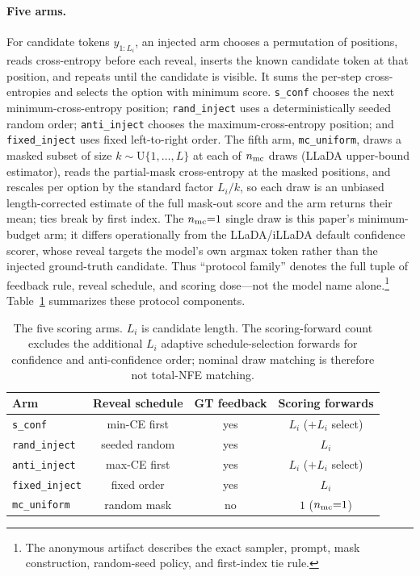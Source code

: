 \documentclass{article}
\newcommand{\sconf}{\texttt{s\_conf}}
\newcommand{\rinj}{\texttt{rand\_inject}}
\newcommand{\ainj}{\texttt{anti\_inject}}
\newcommand{\finj}{\texttt{fixed\_inject}}
\newcommand{\mcu}{\texttt{mc\_uniform}}
\begin{document}
\paragraph{Five arms.}
For candidate tokens $y_{1:L_i}$, an injected arm chooses a permutation of
positions, reads cross-entropy before each reveal, inserts the known candidate
token at that position, and repeats until the candidate is visible.  It sums
the per-step cross-entropies and selects the option with minimum score.
\sconf{} chooses the next minimum-cross-entropy position; \rinj{} uses a
deterministically seeded random order; \ainj{} chooses the maximum-cross-entropy
position; and \finj{} uses fixed left-to-right order.  The fifth arm, \mcu{},
draws a masked subset of size $k \sim \mathrm{U}\{1,\dots,L\}$ at each of
$n_{\rm mc}$ draws (LLaDA upper-bound estimator), reads the partial-mask
cross-entropy at the masked positions, and rescales per option by the standard
factor $L_i/k$, so each draw is an unbiased length-corrected estimate of the
full mask-out score and the arm returns their mean; ties break by first
index.  The $n_{\rm mc}{=}1$ single draw is this paper's minimum-budget arm;
it differs operationally from the LLaDA/iLLaDA default confidence scorer,
whose reveal targets the model's own argmax token rather than the injected
ground-truth candidate.  Thus ``protocol family''
denotes the full tuple of feedback rule, reveal schedule, and scoring dose---not
the model name alone.\footnote{The anonymous artifact describes the exact
sampler, prompt, mask construction, random-seed policy, and first-index tie
rule.}  Table~\ref{tab:arms} summarizes these protocol components.

\begin{table}[t]
\centering
\setlength{\tabcolsep}{3.4pt}
\caption{The five scoring arms.  $L_i$ is candidate length.  The scoring-forward
count excludes the additional $L_i$ adaptive schedule-selection forwards for
confidence and anti-confidence order; nominal draw matching is therefore not
total-NFE matching.}
\label{tab:arms}
\begin{tabular}{@{}lccc@{}}
\toprule
Arm & Reveal schedule & GT feedback & Scoring forwards \\
\midrule
\sconf{} & min-CE first & yes & $L_i$ ($+L_i$ select) \\
\rinj{} & seeded random & yes & $L_i$ \\
\ainj{} & max-CE first & yes & $L_i$ ($+L_i$ select) \\
\finj{} & fixed order & yes & $L_i$ \\
\mcu{} & random mask & no & \multicolumn{1}{c}{$1$ ($n_{\rm mc}{=}1$)} \\
\bottomrule
\end{tabular}
\end{table}
\end{document}
